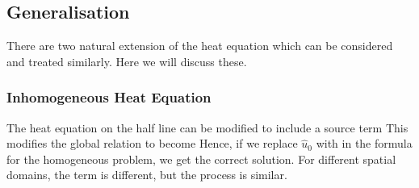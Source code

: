 \documentclass{article}
\begin{document}
\subsection{Generalisation}
There are two natural extension of the heat equation which can be considered and treated similarly. Here we will discuss these. 

\subsubsection{Inhomogeneous Heat Equation}
The heat equation on the half line can be modified to include a source term 
This modifies the global relation to become 
Hence, if we replace $\hat{u}_0$ with  
in the formula for the homogeneous problem, we get the correct solution. For different spatial domains, the term is different, but the process is similar. 
\end{document}
